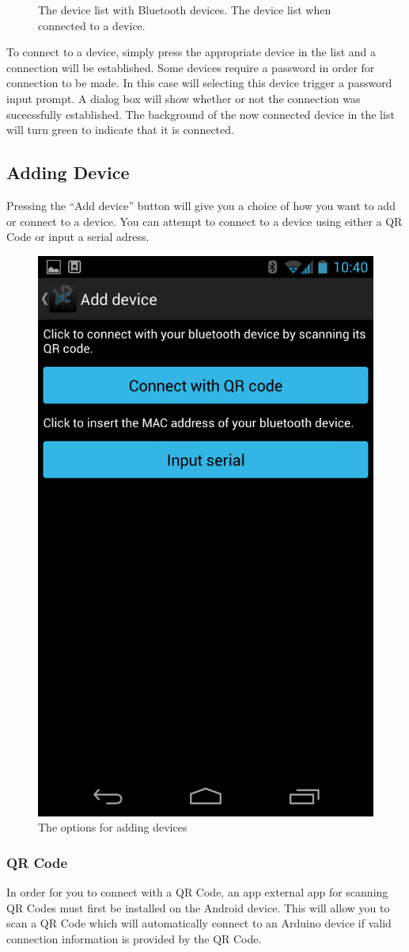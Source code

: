 \begin{figure}[H]
{			\label{fig:bt-connected}
		}%
		\caption{\protect{\ref{fig:bt-list}} The device list with Bluetooth devices. \protect{\ref{fig:bt-connected}} The device list when connected to a device.}
	\end{figure}

		 To connect to a device, simply press the appropriate device in the list and a connection will be established. Some devices require a password in order for connection to be made. In this case will selecting this device trigger a password input prompt. A dialog box will show whether or not the connection was sucecssfully established. The background of the now connected device in the list will turn green to indicate that it is connected. \\

		\subsection{Adding Device}
			Pressing the ``Add device'' button will give you a choice of how you want to add or connect to a device. You can attempt to connect to a device using either a QR Code or input a serial adress.
		\newline
		\begin{figure}[H]
			\centering
			\includegraphics[width=0.5 \textwidth]{images/Screenshots/add_device.png}
			\caption{The options for adding devices}
		\end{figure}

			\subsubsection{QR Code}
				In order for you to connect with a QR Code, an app external app for scanning QR Codes must first be installed on the Android device. This will allow you to scan a QR Code which will automatically connect to an Arduino device if valid connection information is provided by the QR Code.\\

